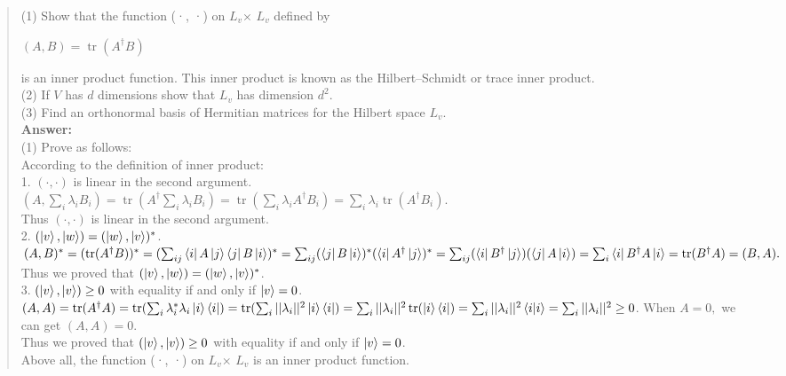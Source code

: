 \documentclass[UTF8]{ctexart}
\begin{document}
\begin{quote}
(1) Show that the function (·, ·) on $L_{v}$× $L_{v}$ defined by 
\begin{center}
$(A, B)=\operatorname{tr}(A^{\dagger}B)$
\end{center}
is an inner product function. This inner product is known as the Hilbert–Schmidt or trace inner product. 
\\
(2) If $V$ has $d$ dimensions show that $L_{v}$ has dimension $d^{2}$. 
\\
(3) Find an orthonormal basis of Hermitian matrices for the Hilbert space $L_{v}$. 
\\
\textbf{Answer:}\\
(1) Prove as follows: \\
According to the definition of inner product:\\
1. $(·, ·)$ is linear in the second argument.\\
$(A,\sum_{i}\lambda_{i}B_{i})=\operatorname{tr}(A^{\dagger}\sum_{i}\lambda_{i}B_{i})=\operatorname{tr}(\sum_{i}\lambda_{i}A^{\dagger}B_{i})=\sum_{i}\lambda_{i}\operatorname{tr}(A^{\dagger}B_{i}).$\\
Thus $(·, ·)$ is linear in the second argument.
\\
2. $(\ket{v},\ket{w})=(\ket{w},\ket{v})^{*}$. \\
$(A,B)^{*}=(\operatorname{tr}(A^{\dagger}B))^{*}
=(\sum_{ij}\bra{i}A\ket{j}\bra{j}B\ket{i})^{*}
=\sum_{ij}(\bra{j}B\ket{i})^{*}(\bra{i}A^{\dagger}\ket{j})^{*}
=\sum_{ij}(\bra{i}B^{\dagger}\ket{j})(\bra{j}A\ket{i})\\
=\sum_{i}\bra{i}B^{\dagger}A\ket{i}
=\operatorname{tr}(B^{\dagger}A)
=(B,A).
$\\
Thus we proved that $(\ket{v},\ket{w})=(\ket{w},\ket{v})^{*}$. 
\\
3. $(\ket{v},\ket{v})\geq 0$ with equality if and only if $\ket{v} = 0$.\\
$
(A,A)=\operatorname{tr}(A^{\dagger}A)=\operatorname{tr}(\sum_{i}\lambda_{i}^{*}\lambda_{i}\ket{i}\bra{i})
=\operatorname{tr}(\sum_{i}||\lambda_{i}||^{2}\ket{i}\bra{i})
=\sum_{i}||\lambda_{i}||^{2}\operatorname{tr}(\ket{i}\bra{i})\\
=\sum_{i}||\lambda_{i}||^{2}\bra{i}\ket{i}
=\sum_{i}||\lambda_{i}||^{2} \geq 0$. When $A = 0,$ we can get $(A,A)=0$.
\\
Thus we proved that $(\ket{v},\ket{v})\geq 0$ with equality if and only if $\ket{v} = 0$.\\
Above all, the function (·, ·) on $L_{v}$× $L_{v}$ is an inner product function. \\

\end{quote}
\end{document}
